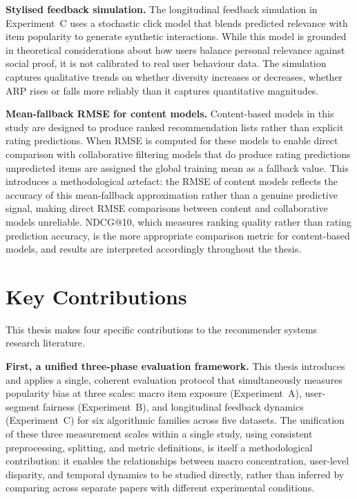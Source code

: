 \documentclass[11pt,a4paper]{report}
\begin{document}
\textbf{Stylised feedback simulation.} The longitudinal feedback simulation in Experiment~C uses a stochastic click model that blends predicted relevance with item popularity to generate synthetic interactions. While this model is grounded in theoretical considerations about how users balance personal relevance against social proof, it is not calibrated to real user behaviour data. The simulation captures qualitative trends on whether diversity increases or decreases, whether ARP rises or falls more reliably than it captures quantitative magnitudes.

\textbf{Mean-fallback RMSE for content models.} Content-based models in this study are designed to produce ranked recommendation lists rather than explicit rating predictions. When RMSE is computed for these models to enable direct comparison with collaborative filtering models that do produce rating predictions unpredicted items are assigned the global training mean as a fallback value. This introduces a methodological artefact: the RMSE of content models reflects the accuracy of this mean-fallback approximation rather than a genuine predictive signal, making direct RMSE comparisons between content and collaborative models unreliable. NDCG@10, which measures ranking quality rather than rating prediction accuracy, is the more appropriate comparison metric for content-based models, and results are interpreted accordingly throughout the thesis.

\section{Key Contributions}

This thesis makes four specific contributions to the recommender systems research literature.

\textbf{First, a unified three-phase evaluation framework.} This thesis introduces and applies a single, coherent evaluation protocol that simultaneously measures popularity bias at three scales: macro item exposure (Experiment~A), user-segment fairness (Experiment~B), and longitudinal feedback dynamics (Experiment~C) for six algorithmic families across five datasets. The unification of these three measurement scales within a single study, using consistent preprocessing, splitting, and metric definitions, is itself a methodological contribution: it enables the relationships between macro concentration, user-level disparity, and temporal dynamics to be studied directly, rather than inferred by comparing across separate papers with different experimental conditions.
\end{document}
